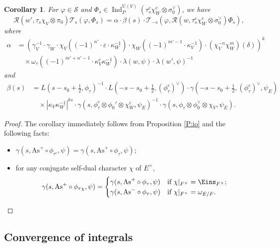 \documentclass[11pt]{amsart}
\numberwithin{equation}{section}
\theoremstyle{plain}
\newtheorem{cor}[thm]{Corollary}
\theoremstyle{definition}
\theoremstyle{remark}
\def\Ind{\operatorname{Ind}}
\def\As{\mathrm{As}}
\def\U{\mathrm{U}}
\def\R{\mathcal{R}}
\def\T{\mathcal{T}}
\def\s{\mathscr{S}}
\def\1{\Eins}
\begin{document}
\begin{cor} \label{C:io}
For $\varphi \in \s$ and $\Phi_s \in \Ind^{\U(V)}_P(\tau^c_s \chi_W^c \otimes \sigma_0^\vee)$, we have
\[
 \R(w', \tau_s \chi_V \otimes \pi_0) \T_s(\varphi, \Phi_s)  
 = \alpha \cdot \beta(s) \cdot \T_{-s}(\varphi, \R(w, \tau_s^c \chi_W^c \otimes \sigma_0^\vee) \Phi_s),
\]
where
\begin{align*}
 \alpha
 & = ( \gamma_V^{-1} \cdot \gamma_W
 \cdot \chi_V((-1)^{n'} \cdot \varepsilon \cdot \kappa_W^{-1})
 \cdot \chi_W((-1)^{m'-1} \cdot \kappa_V^{-1})
 \cdot (\chi_V^{-n} \chi_W^m)(\delta))^k \\
 & \quad \times \omega_{\tau}((-1)^{m'+n'-1} \cdot \kappa_V^c \kappa_W^{-1}) \cdot \lambda(w, \psi) \cdot \lambda(w',\psi)^{-1}
\end{align*}
and
\begin{align*}
 \beta(s) & = L(s-s_0+\tfrac{1}{2}, \phi_\tau)^{-1}
 \cdot L(-s-s_0+\tfrac{1}{2}, (\phi_\tau^c)^\vee) \cdot \gamma(-s-s_0+\tfrac{1}{2}, (\phi^c_\tau)^\vee, \psi_E) \\
 & \quad \times |\kappa_V \kappa_W^{-1}|^{ks}
 \cdot \gamma(s, \phi_{\tau}^c \otimes \phi_0' \otimes \chi_W^c, \psi_E)^{-1} \cdot \gamma(s, \phi_{\tau} \otimes \phi_0^\vee \otimes \chi_V, \psi_E).
\end{align*}
\end{cor}

\begin{proof}
The corollary immediately follows from Proposition \ref{P:io} and the following facts:
\begin{itemize}
\item $\gamma(s, \As^+ \circ \phi_{\tau^c}, \psi) = \gamma(s, \As^+ \circ \phi_\tau, \psi)$;
\item for any conjugate self-dual character $\chi$ of $E^{\times}$, 
\[
 \gamma(s, \As^+ \circ \phi_{\tau \chi}, \psi) =
 \begin{cases}
  \gamma(s, \As^+ \circ \phi_\tau, \psi) & \text{if $\chi|_{F^{\times}} = \1_{F^{\times}}$;} \\
  \gamma(s, \As^- \circ \phi_\tau, \psi) & \text{if $\chi|_{F^{\times}} = \omega_{E/F}$.}
 \end{cases}
\]
\end{itemize}
\end{proof}

\subsection{Convergence of integrals}
\label{s:conv}
\end{document}
